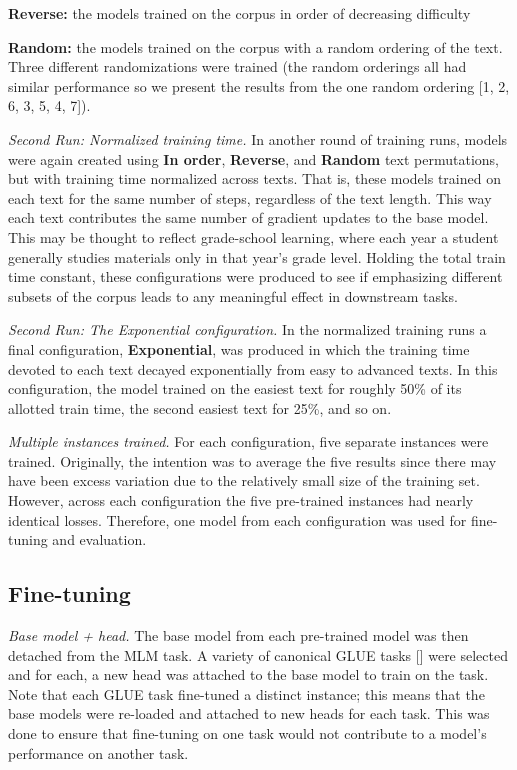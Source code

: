 \documentclass{article}
\begin{document}
\textbf{Reverse:} the models trained on the corpus in order of decreasing difficulty

\textbf{Random:} the models trained on the corpus with a random ordering of the text. Three different randomizations were trained (the random orderings all had similar performance so we present the results from the one random ordering [1, 2, 6, 3, 5, 4, 7]).

\emph{Second Run: Normalized training time.} In another round of training runs, models were again created using \textbf{In order}, \textbf{Reverse}, and \textbf{Random} text permutations, but with training time normalized across texts. That is, these models trained on each text for the same number of steps, regardless of the text length. This way each text contributes the same number of gradient updates to the base model. This may be thought to reflect grade-school learning, where each year a student generally studies materials only in that year's grade level. Holding the total train time constant, these configurations were produced to see if emphasizing different subsets of the corpus leads to any meaningful effect in downstream tasks.

\emph{Second Run: The Exponential configuration.} In the normalized training runs a final configuration, \textbf{Exponential}, was produced in which the training time devoted to each text decayed exponentially from easy to advanced texts. In this configuration, the model trained on the easiest text for roughly 50\% of its allotted train time, the second easiest text for 25\%, and so on.

\emph{Multiple instances trained.} For each configuration, five separate instances were trained. Originally, the intention was to average the five results since there may have been excess variation due to the relatively small size of the training set. However, across each configuration the five pre-trained instances had nearly identical losses. Therefore, one model from each configuration was used for fine-tuning and evaluation.

\subsection{Fine-tuning}

\emph{Base model + head.} The base model from each pre-trained model was then detached from the MLM task. A variety of canonical GLUE tasks [] were selected and for each, a new head was attached to the base model to train on the task. Note that each GLUE task fine-tuned a distinct instance; this means that the base models were re-loaded and attached to new heads for each task. This was done to ensure that fine-tuning on one task would not contribute to a model's performance on another task.
\end{document}
